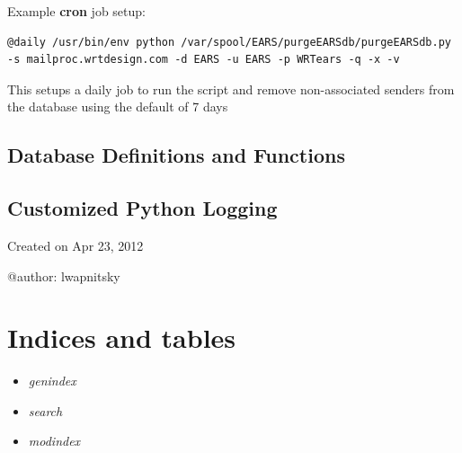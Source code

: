 \documentclass[letterpaper,10pt,english]{sphinxmanual}
\begin{document}
Example \textbf{cron} job setup:

\begin{Verbatim}[commandchars=\\\{\},formatcom=\footnotesize]
@daily /usr/bin/env python /var/spool/EARS/purgeEARSdb/purgeEARSdb.py -s mailproc.wrtdesign.com -d EARS -u EARS -p WRTears -q -x -v
\end{Verbatim}

This setups a daily job to run the script and remove non-associated senders from the database using the default of 7 days


\section{Database Definitions and Functions}
\label{codedocs/database:database-definitions-and-functions}\label{codedocs/database::doc}\label{codedocs/database:sqlalchemy}\label{codedocs/database:module-database.SQLAlchemy}\label{codedocs/database:sqlalchemy}\label{codedocs/database:module-database.toDB}

\section{Customized Python Logging}
\label{codedocs/logs:customized-python-logging}\label{codedocs/logs::doc}\label{codedocs/logs:module-logs}\label{codedocs/logs:module-logs.logger}
Created on Apr 23, 2012

@author: lwapnitsky


\chapter{Indices and tables}
\label{index:indices-and-tables}\begin{itemize}
\item {} 
\emph{genindex}

\item {} 
\emph{search}

\item {} 
\emph{modindex}

\end{itemize}



\renewcommand{\indexname}{Index}
\printindex
\end{document}
